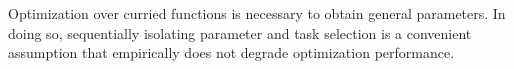 \begin{tcolorbox}[colback=white, colframe=black, rounded corners, left=5pt, right=5pt, top=5pt, bottom=5pt, boxsep=5pt, boxrule=0.75pt]
  Optimization over curried functions is necessary to obtain general parameters. In doing so, sequentially isolating parameter and task selection is a convenient assumption that empirically does not degrade optimization performance.
\end{tcolorbox}